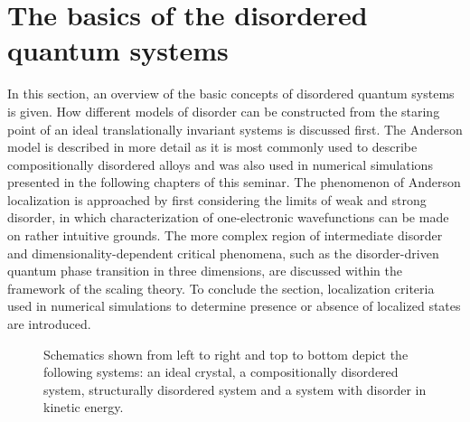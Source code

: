 \documentclass[10pt,a4paper]{article}
\begin{document}
\section{The basics of the disordered quantum systems}
\begin{minipage}[t]{0.57\textwidth} In this section, an overview of the basic concepts of disordered quantum systems is given. How different models of disorder can be constructed from the staring point of an ideal translationally invariant systems is discussed first. The Anderson model is described in more detail as it is most commonly used
to describe compositionally disordered alloys and was also used in numerical simulations presented in the following chapters of this seminar. The phenomenon of Anderson localization is approached by first considering the limits of weak and strong disorder, in which characterization of one-electronic wavefunctions can be made on rather intuitive grounds. The more complex region of intermediate disorder and dimensionality-dependent critical phenomena, such as the disorder-driven quantum phase transition in three dimensions, are discussed within the framework of the scaling theory. To conclude the section, localization criteria used in numerical simulations to determine presence or absence of localized states are introduced. 
\end{minipage}\hfill
\begin{minipage}[t]{0.4\textwidth}
\begin{figure}[H]
\caption{Schematics shown from left to right and top to bottom depict the following systems: an ideal crystal, a compositionally disordered system, structurally disordered system and a system with disorder in kinetic energy.  }
\label{fig:disorder} 
\end{figure}
\end{minipage}
\end{document}
